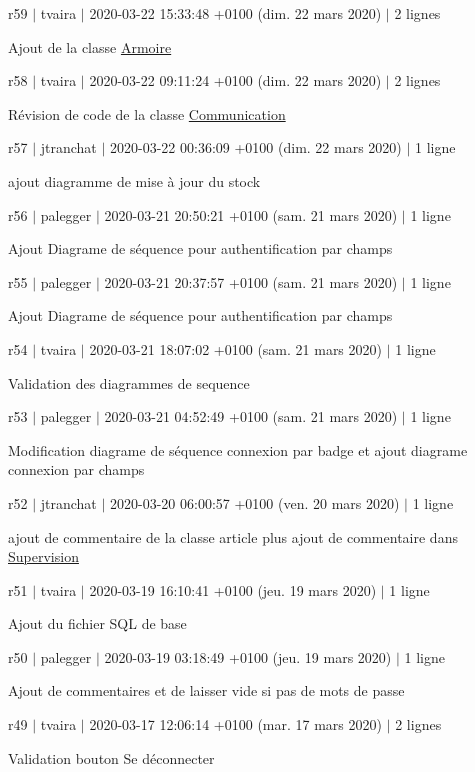 r59 $\vert$ tvaira $\vert$ 2020-\/03-\/22 15\+:33\+:48 +0100 (dim. 22 mars 2020) $\vert$ 2 lignes

Ajout de la classe \hyperlink{class_armoire}{Armoire}

r58 $\vert$ tvaira $\vert$ 2020-\/03-\/22 09\+:11\+:24 +0100 (dim. 22 mars 2020) $\vert$ 2 lignes

Révision de code de la classe \hyperlink{class_communication}{Communication}

r57 $\vert$ jtranchat $\vert$ 2020-\/03-\/22 00\+:36\+:09 +0100 (dim. 22 mars 2020) $\vert$ 1 ligne

ajout diagramme de mise à jour du stock

r56 $\vert$ palegger $\vert$ 2020-\/03-\/21 20\+:50\+:21 +0100 (sam. 21 mars 2020) $\vert$ 1 ligne

Ajout Diagrame de séquence pour authentification par champs

r55 $\vert$ palegger $\vert$ 2020-\/03-\/21 20\+:37\+:57 +0100 (sam. 21 mars 2020) $\vert$ 1 ligne

Ajout Diagrame de séquence pour authentification par champs

r54 $\vert$ tvaira $\vert$ 2020-\/03-\/21 18\+:07\+:02 +0100 (sam. 21 mars 2020) $\vert$ 1 ligne

Validation des diagrammes de sequence

r53 $\vert$ palegger $\vert$ 2020-\/03-\/21 04\+:52\+:49 +0100 (sam. 21 mars 2020) $\vert$ 1 ligne

Modification diagrame de séquence connexion par badge et ajout diagrame connexion par champs

r52 $\vert$ jtranchat $\vert$ 2020-\/03-\/20 06\+:00\+:57 +0100 (ven. 20 mars 2020) $\vert$ 1 ligne

ajout de commentaire de la classe article plus ajout de commentaire dans \hyperlink{class_supervision}{Supervision}

r51 $\vert$ tvaira $\vert$ 2020-\/03-\/19 16\+:10\+:41 +0100 (jeu. 19 mars 2020) $\vert$ 1 ligne

Ajout du fichier S\+QL de base

r50 $\vert$ palegger $\vert$ 2020-\/03-\/19 03\+:18\+:49 +0100 (jeu. 19 mars 2020) $\vert$ 1 ligne

Ajout de commentaires et de laisser vide si pas de mots de passe

r49 $\vert$ tvaira $\vert$ 2020-\/03-\/17 12\+:06\+:14 +0100 (mar. 17 mars 2020) $\vert$ 2 lignes

Validation bouton Se déconnecter


